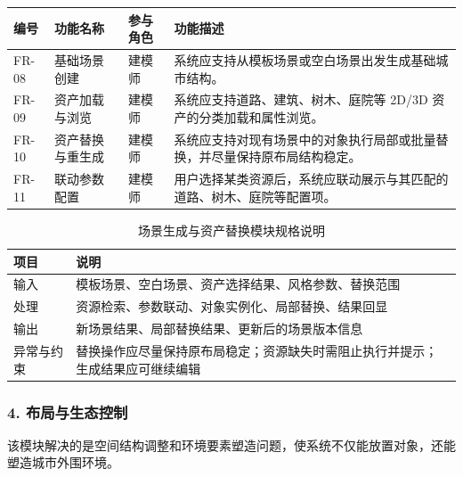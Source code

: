 \documentclass[UTF8,a4paper,10pt]{ctexart}
\begin{document}
{
\renewcommand{\arraystretch}{1.35}

\begin{longtable}{p{1.8cm} p{2.5cm} p{2.1cm} p{6.4cm}}
\toprule
\rowcolor{gray!20}
编号 & 功能名称 & 参与角色 & 功能描述 \\
\midrule
FR-08 & 基础场景创建 & 建模师 & 系统应支持从模板场景或空白场景出发生成基础城市结构。 \\
FR-09 & 资产加载与浏览 & 建模师 & 系统应支持道路、建筑、树木、庭院等 2D/3D 资产的分类加载和属性浏览。 \\
FR-10 & 资产替换与重生成 & 建模师 & 系统应支持对现有场景中的对象执行局部或批量替换，并尽量保持原布局结构稳定。 \\
FR-11 & 联动参数配置 & 建模师 & 用户选择某类资源后，系统应联动展示与其匹配的道路、树木、庭院等配置项。 \\
\bottomrule
\end{longtable}
}

{
\renewcommand{\arraystretch}{1.3}
\begin{table}[H]
\centering
\caption{场景生成与资产替换模块规格说明}
\begin{tabularx}{\textwidth}{p{2.6cm} Y}
\toprule
{}
项目 & 说明 \\
\midrule
输入 & 模板场景、空白场景、资产选择结果、风格参数、替换范围 \\
处理 & 资源检索、参数联动、对象实例化、局部替换、结果回显 \\
输出 & 新场景结果、局部替换结果、更新后的场景版本信息 \\
异常与约束 & 替换操作应尽量保持原布局稳定；资源缺失时需阻止执行并提示；生成结果应可继续编辑 \\
\bottomrule
\end{tabularx}
\end{table}
}

\subsubsection*{4. 布局与生态控制}
该模块解决的是空间结构调整和环境要素塑造问题，使系统不仅能放置对象，还能塑造城市外围环境。
\end{document}
